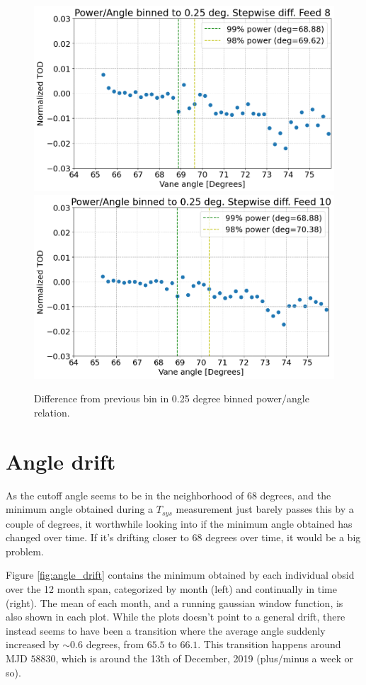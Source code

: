 \documentclass[10pt, a4paper]{article}
\begin{document}
\vspace{1cm}
\begin{figure}[h!]
    \centering
    \includegraphics[scale=0.37]{../plots/binned_diff8.png}
    \includegraphics[scale=0.37]{../plots/binned_diff10.png}
    \caption{Difference from previous bin in 0.25 degree binned power/angle relation.}
    \label{fig:8and10_diff}
\end{figure}


\section{Angle drift}
As the cutoff angle seems to be in the neighborhood of 68 degrees, and the minimum angle obtained during a $T_{sys}$ measurement just barely passes this by a couple of degrees, it worthwhile looking into if the minimum angle obtained has changed over time. If it's drifting closer to 68 degrees over time, it would be a big problem.

Figure \ref{fig:angle_drift} contains the minimum obtained by each individual obsid over the 12 month span, categorized by month (left) and continually in time (right). The mean of each month, and a running gaussian window function, is also shown in each plot. While the plots doesn't point to a general drift, there instead seems to have been a transition where the average angle suddenly increased by $\sim 0.6$ degrees, from $65.5$ to $66.1$. This transition happens around MJD $58830$, which is around the 13th of December, 2019 (plus/minus a week or so).
\end{document}

